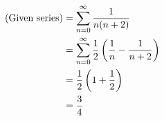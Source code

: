 \item

\begin{align*}
	(\text{Given series})
	&= \sum_{n=0}^\infty \frac{1}{n(n + 2)} \\
	&= \sum_{n=0}^\infty \frac{1}{2} \left( \frac{1}{n} - \frac{1}{n + 2} \right) \\
	&= \frac{1}{2} \left( 1 + \frac{1}{2} \right) \\
	&= \frac{3}{4}
\end{align*}	